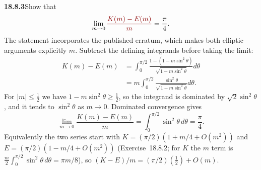 \par\bigskip
\noindent\textbf{18.8.3}\quad Show that
\[
\lim_{m\to0}\erratum{\frac{K(m)-E(m)}{m}}
=\frac{\pi}{4}.
\]
\solution
The statement incorporates the published erratum, which makes
both elliptic arguments explicitly $m$.
Subtract the defining integrands before taking the limit:
\begin{align*}
K(m)-E(m)
 &=\int_0^{\pi/2}
 \frac{1-(1-m\sin^2\theta)}{\sqrt{1-m\sin^2\theta}}d\theta\\
 &=m\int_0^{\pi/2}\frac{\sin^2\theta}
                               {\sqrt{1-m\sin^2\theta}}d\theta.
\end{align*}
For $|m|\le\frac12$ we have $1-m\sin^2\theta\ge\frac12$, so the
integrand is dominated by $\sqrt2\sin^2\theta$, and it tends to
$\sin^2\theta$ as $m\to0$.  Dominated convergence gives
\[
\boxed{\lim_{m\to0}\frac{K(m)-E(m)}m
 =\int_0^{\pi/2}\sin^2\theta\,d\theta=\frac\pi4}.
\]
Equivalently the two series start with
$K=(\pi/2)(1+m/4+O(m^2))$ and
$E=(\pi/2)(1-m/4+O(m^2))$ (Exercise~18.8.2; for $K$ the $m$ term
is $\frac m2\int_0^{\pi/2}\sin^2\theta\,d\theta=\pi m/8$), so
$(K-E)/m=(\pi/2)(\tfrac12)+O(m)$.

